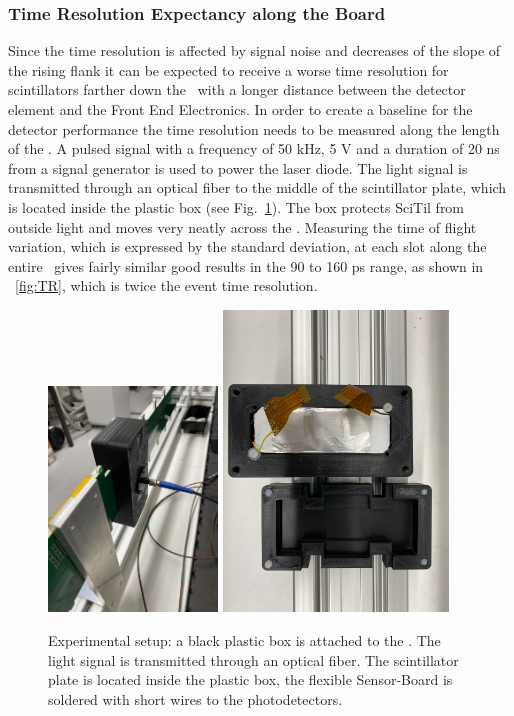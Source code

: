\documentclass[../BTOF_summary.tex]{subfiles}
\begin{document}
\subsubsection{Time Resolution Expectancy along the Board}

Since the time resolution is affected by signal noise and decreases of the slope of the rising flank it can be expected to receive a worse time resolution for scintillators farther down the \railboard\ with a longer distance between the detector element and the Front End Electronics.
In order to create a baseline for the detector performance the time resolution needs to be measured along the length of the \railboard .
A pulsed signal with a frequency of 50 kHz, 5 V and a duration of 20 ns from a signal generator is used to power the laser diode. The light signal is transmitted through an optical fiber to the middle of the scintillator plate, which is located inside the plastic box (see Fig.~\ref{fig:Box_SciTile}). The box protects SciTil from outside light and moves very neatly across the \railboard.
Measuring the time of flight variation, which is expressed by the standard deviation, at each slot along the entire \railboard\ gives fairly similar good results in the 90 to 160 ps range, as shown in \fig~\ref{fig:TR}, which is twice the event time resolution. 

\begin{figure}[htbp]
   \centering
    \includegraphics[height=6cm]{Pictures/Box_SciTile.pdf}
    \includegraphics[width=6cm, angle=90]{Pictures/Box_SciTile1.pdf}
    \caption{Experimental setup: a black plastic box is attached to the \railboard . The light signal is transmitted through an optical fiber. The scintillator plate is located inside the plastic box, the flexible Sensor-Board is soldered with short wires to the photodetectors.}
    \label{fig:Box_SciTile}
\end{figure}
\end{document}
